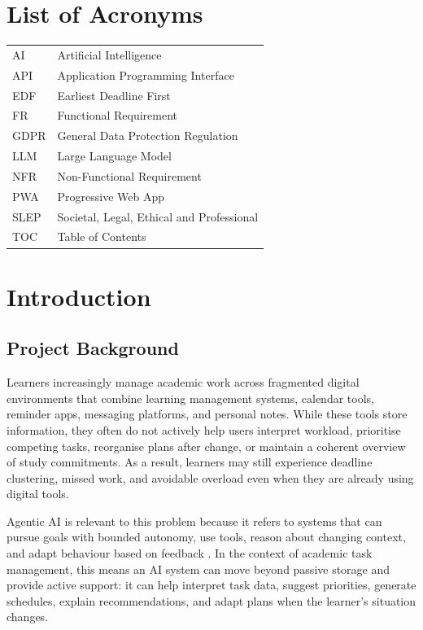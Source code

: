 \documentclass[12pt]{article}
\begin{document}
\newpage
{}
\listoffigures

\newpage
{}
\listoftables

\newpage
\section*{List of Acronyms}
\begin{tabular}{ll}
AI & Artificial Intelligence \\
API & Application Programming Interface \\
EDF & Earliest Deadline First \\
FR & Functional Requirement \\
GDPR & General Data Protection Regulation \\
LLM & Large Language Model \\
NFR & Non-Functional Requirement \\
PWA & Progressive Web App \\
SLEP & Societal, Legal, Ethical and Professional \\
TOC & Table of Contents \\
\end{tabular}

\newpage

\section{Introduction}

\subsection{Project Background}
Learners increasingly manage academic work across fragmented digital environments that combine learning management systems, calendar tools, reminder apps, messaging platforms, and personal notes. While these tools store information, they often do not actively help users interpret workload, prioritise competing tasks, reorganise plans after change, or maintain a coherent overview of study commitments. As a result, learners may still experience deadline clustering, missed work, and avoidable overload even when they are already using digital tools.

Agentic AI is relevant to this problem because it refers to systems that can pursue goals with bounded autonomy, use tools, reason about changing context, and adapt behaviour based on feedback \parencite{10849561}. In the context of academic task management, this means an AI system can move beyond passive storage and provide active support: it can help interpret task data, suggest priorities, generate schedules, explain recommendations, and adapt plans when the learner's situation changes.
\end{document}
